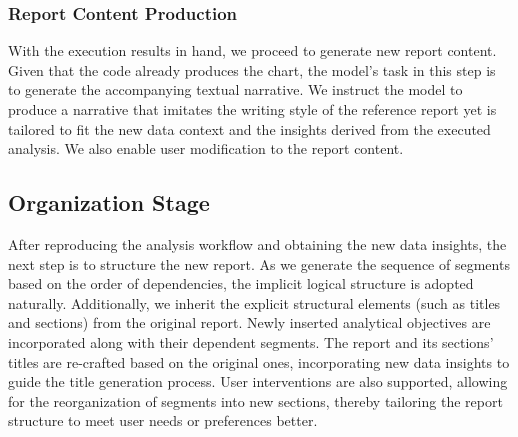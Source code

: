 \subsubsection{Report Content Production}

With the execution results in hand, we proceed to generate new report content. 
Given that the code already produces the chart, the model's task in this step is to generate the accompanying textual narrative. 
We instruct the model to produce a narrative that imitates the writing style of the reference report yet is tailored to fit the new data context and the insights derived from the executed analysis. 
We also enable user modification to the report content. 

\subsection{Organization Stage}

After reproducing the analysis workflow and obtaining the new data insights, the next step is to structure the new report. 
As we generate the sequence of segments based on the order of dependencies, the implicit logical structure is adopted naturally. 
Additionally, we inherit the explicit structural elements (such as titles and sections) from the original report. 
Newly inserted analytical objectives are incorporated along with their dependent segments. 
The report and its sections' titles are re-crafted based on the original ones, incorporating new data insights to guide the title generation process. 
User interventions are also supported, allowing for the reorganization of segments into new sections, thereby tailoring the report structure to meet user needs or preferences better.


